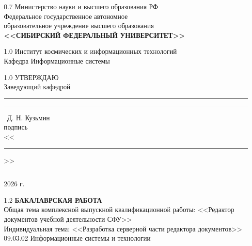 \begin{titlepage}
	\begin{center}
		\begin{spacing}{0.7}
		Министерство науки и высшего образования РФ\\
		{\small Федеральное государственное автономное}\\
		{\small образовательное учреждение высшего образования}\\
		\textbf{\small<<СИБИРСКИЙ ФЕДЕРАЛЬНЫЙ УНИВЕРСИТЕТ>>}\\
		\end{spacing}
		\vfill
		\begin{spacing}{1.0}
		Институт космических и информационных технологий\\
		Кафедра Информационные системы\\
		\end{spacing}
    \end{center}		
	\begin{minipage}[h]{0.45\linewidth}
	\hfil
	\end{minipage}
	\hspace{5mm}
	\begin{minipage}[h]{0.45\linewidth}
		\begin{spacing}{1.0}
			УТВЕРЖДАЮ\\
			Заведующий кафедрой\\[5mm]
			\rule{2cm}{.1pt} \rule{0.8cm}{0pt} ~Д. Н. Кузьмин\\
			{\small подпись}\\[5mm]
			<<\rule{1cm}{.1pt}>>\rule{2.5cm}{.1pt} 2026 г.
		\end{spacing}
	\end{minipage}
		
	\vspace{7mm}
	
	\vfill
	\begin{center}
		\begin{spacing}{1.2}
			{\fontsize{16pt}{14pt}\selectfont \textbf{БАКАЛАВРСКАЯ РАБОТА}}\\[7mm]
			Общая тема комплексной выпускной квалификационной работы: <<Редактор документов учебной деятельности СФУ>>\\
			Индивидуальная тема: <<Разработка серверной части редактора документов>>\\[3mm]
			09.03.02 Информационные системы и технологии\\[3mm]
		\end{spacing}
	\end{center}
	\vfill
	

\end{titlepage}
